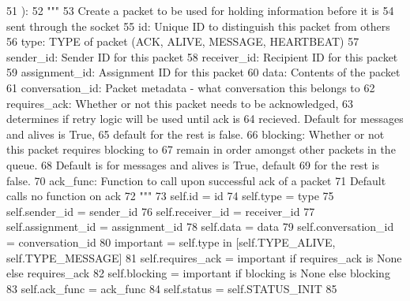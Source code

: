 \begin{DoxyCode}
51     ):
52         \textcolor{stringliteral}{"""}
53 \textcolor{stringliteral}{        Create a packet to be used for holding information before it is}
54 \textcolor{stringliteral}{        sent through the socket}
55 \textcolor{stringliteral}{        id:               Unique ID to distinguish this packet from others}
56 \textcolor{stringliteral}{        type:             TYPE of packet (ACK, ALIVE, MESSAGE, HEARTBEAT)}
57 \textcolor{stringliteral}{        sender\_id:        Sender ID for this packet}
58 \textcolor{stringliteral}{        receiver\_id:      Recipient ID for this packet}
59 \textcolor{stringliteral}{        assignment\_id:    Assignment ID for this packet}
60 \textcolor{stringliteral}{        data:             Contents of the packet}
61 \textcolor{stringliteral}{        conversation\_id:  Packet metadata - what conversation this belongs to}
62 \textcolor{stringliteral}{        requires\_ack:     Whether or not this packet needs to be acknowledged,}
63 \textcolor{stringliteral}{                           determines if retry logic will be used until ack is}
64 \textcolor{stringliteral}{                           recieved. Default for messages and alives is True,}
65 \textcolor{stringliteral}{                           default for the rest is false.}
66 \textcolor{stringliteral}{        blocking:         Whether or not this packet requires blocking to}
67 \textcolor{stringliteral}{                           remain in order amongst other packets in the queue.}
68 \textcolor{stringliteral}{                           Default is for messages and alives is True, default}
69 \textcolor{stringliteral}{                           for the rest is false.}
70 \textcolor{stringliteral}{        ack\_func:         Function to call upon successful ack of a packet}
71 \textcolor{stringliteral}{                           Default calls no function on ack}
72 \textcolor{stringliteral}{        """}
73         self.id = id
74         self.type = type
75         self.sender\_id = sender\_id
76         self.receiver\_id = receiver\_id
77         self.assignment\_id = assignment\_id
78         self.data = data
79         self.conversation\_id = conversation\_id
80         important = self.type \textcolor{keywordflow}{in} [self.TYPE\_ALIVE, self.TYPE\_MESSAGE]
81         self.requires\_ack = important \textcolor{keywordflow}{if} requires\_ack \textcolor{keywordflow}{is} \textcolor{keywordtype}{None} \textcolor{keywordflow}{else} requires\_ack
82         self.blocking = important \textcolor{keywordflow}{if} blocking \textcolor{keywordflow}{is} \textcolor{keywordtype}{None} \textcolor{keywordflow}{else} blocking
83         self.ack\_func = ack\_func
84         self.status = self.STATUS\_INIT
85 
\end{DoxyCode}


